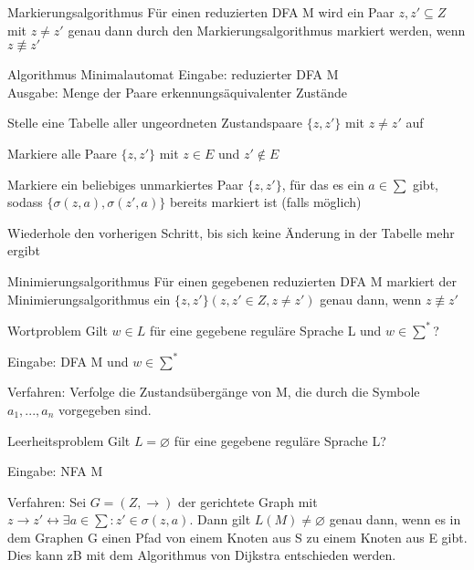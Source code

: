 \documentclass[avery5371, frame]{flashcards}
\begin{document}
\begin{flashcard}[Satz]{Markierungsalgorithmus} Für einen reduzierten DFA M wird ein Paar ${z,z'}\subseteq Z$ mit $z\not = z'$ genau dann durch den Markierungsalgorithmus markiert werden, wenn $z\not \equiv z'$
\end{flashcard}

\begin{flashcard}{Algorithmus Minimalautomat}
    \small
    Eingabe: reduzierter DFA M\\
    Ausgabe: Menge der Paare erkennungsäquivalenter Zustände
    \begin{enumerate*}
        \item Stelle eine Tabelle aller ungeordneten Zustandspaare $\{z,z'\}$ mit $z\not = z'$ auf
        \item Markiere alle Paare $\{z,z'\}$ mit $z\in E$ und $z'\not\in E$
        \item Markiere ein beliebiges unmarkiertes Paar $\{z,z'\}$, für das es ein $a\in\sum$ gibt, sodass $\{\sigma(z,a),\sigma(z',a)\}$ bereits markiert ist (falls möglich)
        \item Wiederhole den vorherigen Schritt, bis sich keine Änderung in der Tabelle mehr ergibt
    \end{enumerate*}
\end{flashcard}

\begin{flashcard}[Satz]{Minimierungsalgorithmus}
    Für einen gegebenen reduzierten DFA M markiert der Minimierungsalgorithmus ein $\{z,z'\}(z,z'\in Z, z\not=z')$ genau dann, wenn $z\not\equiv z'$
\end{flashcard}

\begin{flashcard}{Wortproblem}
    Gilt $w\in L$ für eine gegebene reguläre Sprache L und $w\in\sum^*$?

    Eingabe: DFA M und $w\in\sum^*$

    Verfahren: Verfolge die Zustandsübergänge von M, die durch die Symbole $a_1,...,a_n$ vorgegeben sind.
\end{flashcard}

\begin{flashcard}{Leerheitsproblem}
    Gilt $L=\varnothing$ für eine gegebene reguläre Sprache L?

    Eingabe: NFA M

    Verfahren: Sei $G=(Z,\rightarrow)$ der gerichtete Graph mit $z\rightarrow z' \leftrightarrow \exists a \in \sum: z'\in\sigma(z,a)$. Dann gilt $L(M)\not =\varnothing$ genau dann, wenn es in dem Graphen G einen Pfad von einem Knoten aus S zu einem Knoten aus E gibt. Dies kann zB mit dem Algorithmus von Dijkstra entschieden werden.
\end{flashcard}
\end{document}
